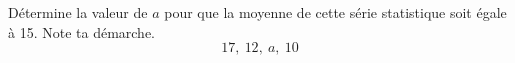 %
%
    Détermine la valeur de $a$ pour que la moyenne de cette série statistique soit égale à 15. Note ta démarche.
    \[17,\ 12,\ a,\ 10\]
